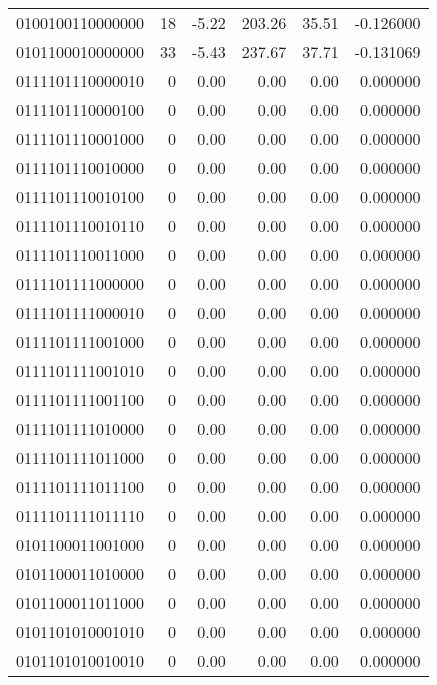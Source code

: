 \begin{tabular}{lrrrrr}
0100100110000000 &        18 &     -5.22 &   203.26 &    35.51 & -0.126000 \\
0101100010000000 &        33 &     -5.43 &   237.67 &    37.71 & -0.131069 \\
0111101110000010 &         0 &      0.00 &     0.00 &     0.00 &  0.000000 \\
0111101110000100 &         0 &      0.00 &     0.00 &     0.00 &  0.000000 \\
0111101110001000 &         0 &      0.00 &     0.00 &     0.00 &  0.000000 \\
0111101110010000 &         0 &      0.00 &     0.00 &     0.00 &  0.000000 \\
0111101110010100 &         0 &      0.00 &     0.00 &     0.00 &  0.000000 \\
0111101110010110 &         0 &      0.00 &     0.00 &     0.00 &  0.000000 \\
0111101110011000 &         0 &      0.00 &     0.00 &     0.00 &  0.000000 \\
0111101111000000 &         0 &      0.00 &     0.00 &     0.00 &  0.000000 \\
0111101111000010 &         0 &      0.00 &     0.00 &     0.00 &  0.000000 \\
0111101111001000 &         0 &      0.00 &     0.00 &     0.00 &  0.000000 \\
0111101111001010 &         0 &      0.00 &     0.00 &     0.00 &  0.000000 \\
0111101111001100 &         0 &      0.00 &     0.00 &     0.00 &  0.000000 \\
0111101111010000 &         0 &      0.00 &     0.00 &     0.00 &  0.000000 \\
0111101111011000 &         0 &      0.00 &     0.00 &     0.00 &  0.000000 \\
0111101111011100 &         0 &      0.00 &     0.00 &     0.00 &  0.000000 \\
0111101111011110 &         0 &      0.00 &     0.00 &     0.00 &  0.000000 \\
0101100011001000 &         0 &      0.00 &     0.00 &     0.00 &  0.000000 \\
0101100011010000 &         0 &      0.00 &     0.00 &     0.00 &  0.000000 \\
0101100011011000 &         0 &      0.00 &     0.00 &     0.00 &  0.000000 \\
0101101010001010 &         0 &      0.00 &     0.00 &     0.00 &  0.000000 \\
0101101010010010 &         0 &      0.00 &     0.00 &     0.00 &  0.000000 \\

\end{tabular}
